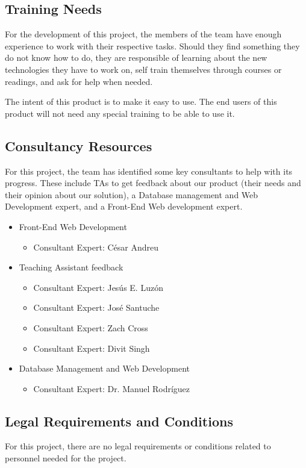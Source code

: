\subsection{Training Needs}

For the development of this project, the members of the team have enough
experience to work with their respective tasks. Should they find something they
do not know how to do, they are responsible of learning about the new
technologies they have to work on, self train themselves through courses or
readings, and ask for help when needed.

The intent of this product is to make it easy to use. The end users of this
product will not need any special training to be able to use it.

\subsection{Consultancy Resources}

For this project, the team has identified some key consultants to help with its
progress. These include TAs to get feedback about our product (their needs and
their opinion about our solution), a Database management and Web Development
expert, and a Front-End Web development expert.

\begin{itemize}
\item Front-End Web Development
\begin{itemize}
\item Consultant Expert: César Andreu
\end{itemize}
\item Teaching Assistant feedback
\begin{itemize}
\item Consultant Expert: Jesús E. Luzón
\item Consultant Expert: José Santuche
\item Consultant Expert: Zach Cross
\item Consultant Expert: Divit Singh
\end{itemize}
\item Database Management and Web Development
\begin{itemize}
\item Consultant Expert: Dr. Manuel Rodríguez
\end{itemize}
\end{itemize}

\subsection{Legal Requirements and Conditions}

For this project, there are no legal requirements or conditions related to
personnel needed for the project.